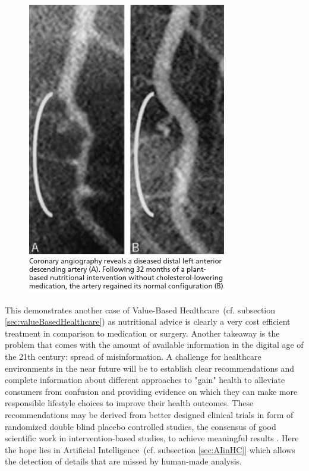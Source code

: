 \begin{figure}[htpb]
    \centering
    \includegraphics[width=0.8\linewidth]{media/Screenshot_2020-01-07_JFP_06307_Article1 pdf.png}
    \caption{\cite{esselstyn2014way}}%
    \label{fig:reverseCAD}
\end{figure}
This demonstrates another case of Value-Based Healthcare~(cf. subsection \ref{sec:valueBasedHealthcare}) as nutritional advice is clearly a very cost efficient treatment in comparison to medication or surgery. Another takeaway is the problem that comes with the amount of available information in the digital age of the 21th century: spread of misinformation. A challenge for healthcare environments in the near future will be to establish clear recommendations and complete information about different approaches to "gain" health to alleviate consumers from confusion and providing evidence on which they can make more responsible lifestyle choices to improve their health outcomes. These recommendations may be derived from better designed clinical trials in form of randomized double blind placebo controlled studies, the consensus of good scientific work in intervention-based studies, to achieve meaningful results \cite{misra2012randomized}. Here the hope lies in Artificial Intelligence~(cf. subsection \ref{sec:AIinHC}] which allows the detection of details that are missed by human-made analysis.
